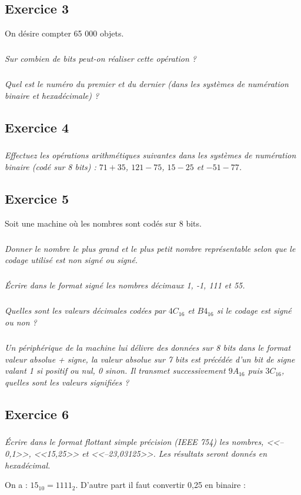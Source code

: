 \documentclass[10pt,fleqn]{article} %
\begin{document}
\begin{multicols}{2}
\begin{corrige}
\end{corrige}
\else
\fi


\subsection*{Exercice 3}
\setcounter{subparagraph}{0}
On désire compter 65 000 objets.
\subparagraph{}\textit{Sur combien de bits peut-on réaliser cette opération ? }
\subparagraph{}\textit{Quel est le numéro du premier et du dernier (dans les systèmes de numération binaire et hexadécimale) ?}

\subsection*{Exercice 4}
\setcounter{subparagraph}{0}
\subparagraph{}\textit{Effectuez les opérations arithmétiques suivantes dans les systèmes de numération binaire (codé sur 8 bits) : $71+35$, $121-75$, $15-25$ et $- 51 - 77$.}

\subsection*{Exercice 5}
\setcounter{subparagraph}{0}
Soit une machine où les nombres sont codés sur 8 bits.
\subparagraph{}\textit{Donner le nombre le plus grand et le plus petit nombre représentable selon que le codage utilisé est non signé ou signé. }
\subparagraph{}\textit{Écrire dans le format signé les nombres décimaux 1, -1, 111 et 55.}
\subparagraph{}\textit{Quelles sont  les valeurs décimales codées par $4C_{16}$ et $B4_{16}$ si le codage est signé ou non ?}
\subparagraph{}\textit{Un périphérique de la machine lui délivre des données sur 8 bits dans le format valeur absolue + signe, la valeur absolue sur 7 bits est précédée d’un bit de signe valant 1 si positif ou nul, 0 sinon. Il transmet successivement $9A_{16}$ puis $3C_{16}$, quelles sont les valeurs signifiées ? }

\subsection*{Exercice 6}
\setcounter{subparagraph}{0}
\subparagraph*{}\textit{Écrire dans le format flottant simple précision (IEEE 754) les nombres,  	<<–0,1>>,  	<<15,25>>  et <<–23,03125>>. Les résultats seront donnés en hexadécimal.}
\ifprof

\begin{corrige}
On a : $15_{10}=1111_2$. D'autre part il faut convertir 0,25 en binaire : 


\end{corrige}
\end{multicols}
\end{document}
